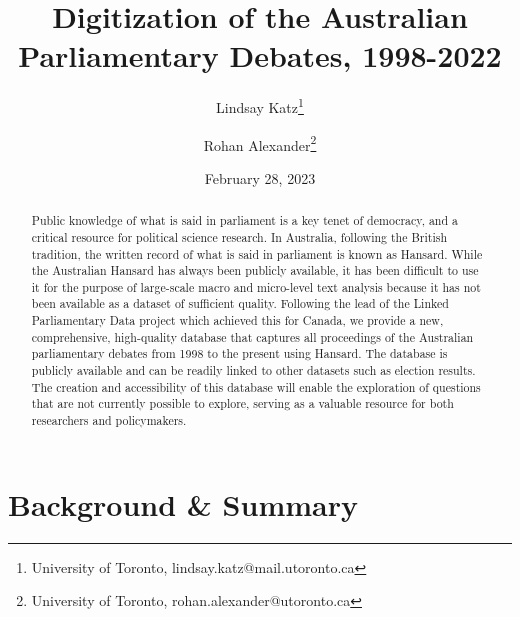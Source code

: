 \documentclass[
  letterpaper,
  DIV=11,
  numbers=noendperiod]{scrartcl}
\title{Digitization of the Australian Parliamentary Debates, 1998-2022}
\author{Lindsay Katz\footnote{University of Toronto,
  lindsay.katz@mail.utoronto.ca} \and Rohan Alexander\footnote{University
  of Toronto, rohan.alexander@utoronto.ca}}
\date{February 28, 2023}
\begin{document}
\maketitle
\begin{abstract}
Public knowledge of what is said in parliament is a key tenet of
democracy, and a critical resource for political science research. In
Australia, following the British tradition, the written record of what
is said in parliament is known as Hansard. While the Australian Hansard
has always been publicly available, it has been difficult to use it for
the purpose of large-scale macro and micro-level text analysis because
it has not been available as a dataset of sufficient quality. Following
the lead of the Linked Parliamentary Data project which achieved this
for Canada, we provide a new, comprehensive, high-quality database that
captures all proceedings of the Australian parliamentary debates from
1998 to the present using Hansard. The database is publicly available
and can be readily linked to other datasets such as election results.
The creation and accessibility of this database will enable the
exploration of questions that are not currently possible to explore,
serving as a valuable resource for both researchers and policymakers.
\end{abstract}
\ifdefined\Shaded\renewenvironment{Shaded}{\begin{tcolorbox}[interior hidden, breakable, enhanced, sharp corners, frame hidden, borderline west={3pt}{0pt}{shadecolor}, boxrule=0pt]}{\end{tcolorbox}}\fi

\hypertarget{sec-intro}{%
\section{Background \& Summary}\label{sec-intro}}
\end{document}
